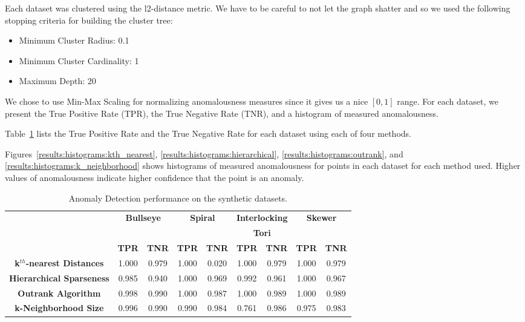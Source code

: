 Each dataset was clustered using the l2-distance metric.
We have to be careful to not let the graph shatter and so we used the following stopping criteria for building the cluster tree:

\begin{itemize}
    \item Minimum Cluster Radius: 0.1
    \item Minimum Cluster Cardinality: 1
    \item Maximum Depth: 20
\end{itemize}

We chose to use Min-Max Scaling for normalizing anomalousness measures since it gives us a nice $[0, 1]$ range.
For each dataset, we present the True Positive Rate (TPR), the True Negative Rate (TNR), and a histogram of measured anomalousness.

Table~\ref{results:table} lists the True Positive Rate and the True Negative Rate for each dataset using each of four methods.

Figures~\ref{results:histograms:kth_nearest}, \ref{results:histograms:hierarchical}, \ref{results:histograms:outrank}, and \ref{results:histograms:k_neighborhood} shows histograms of measured anomalousness for points in each dataset for each method used.
Higher values of anomalousness indicate higher confidence that the point is an anomaly.

\begin{table}[!t]
\renewcommand{\arraystretch}{1.3}
\caption{Anomaly Detection performance on the synthetic datasets.}
\label{results:table}
\centering
\begin{tabular}{|c|c|c|c|c|c|c|c|c|}
\hline
 & \multicolumn{2}{c|}{\textbf{Bullseye}} & \multicolumn{2}{c|}{\textbf{Spiral}} & \multicolumn{2}{c|}{\textbf{Interlocking}} & \multicolumn{2}{c|}{\textbf{Skewer}} \\
  & \multicolumn{2}{c|}{\textbf{ }} & \multicolumn{2}{c|}{\textbf{ }} & \multicolumn{2}{c|}{\textbf{Tori}} & \multicolumn{2}{c|}{\textbf{ }} \\
\hline
 & \bfseries TPR & \bfseries TNR & \bfseries TPR & \bfseries TNR & \bfseries TPR & \bfseries TNR & \bfseries TPR & \bfseries TNR \\
\hline
\bfseries k$^{th}$-nearest Distances & 1.000 & 0.979 & 1.000 & 0.020 & 1.000 & 0.979 & 1.000 & 0.979 \\
\hline
\bfseries Hierarchical Sparseness & 0.985 & 0.940 & 1.000 & 0.969 & 0.992 & 0.961 & 1.000 & 0.967 \\
\hline
\bfseries Outrank Algorithm & 0.998 & 0.990 & 1.000 & 0.987 & 1.000 & 0.989 & 1.000 & 0.989 \\
\hline
\bfseries k-Neighborhood Size & 0.996 & 0.990 & 0.990 & 0.984 & 0.761 & 0.986 & 0.975 & 0.983 \\
\hline
\end{tabular}
\end{table}

